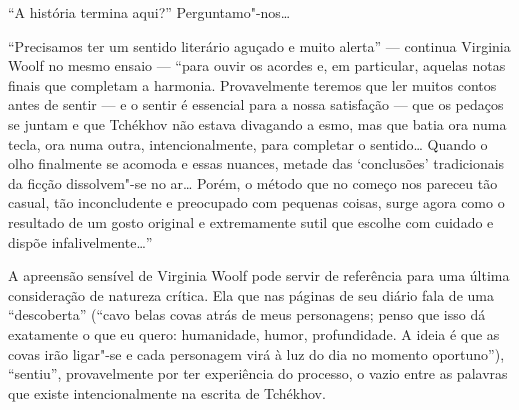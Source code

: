 {{``A história termina aqui?'' Perguntamo"-nos\ldots{}

``Precisamos ter um sentido
literário aguçado e muito alerta'' --- continua Virginia Woolf no mesmo ensaio --- ``para
ouvir os acordes e, em particular, aquelas notas finais que completam a
harmonia. Provavelmente teremos que ler muitos contos antes de sentir ---
e o sentir é essencial para a nossa satisfação --- que os pedaços se
juntam e que Tchékhov não estava divagando a esmo, mas que batia ora
numa tecla, ora numa outra, intencionalmente, para completar o
sentido\ldots{} Quando o olho finalmente se acomoda e essas nuances, metade
das `conclusões' tradicionais da ficção dissolvem"-se no ar\ldots{} Porém, o
método que no começo nos pareceu tão casual, tão inconcludente e
preocupado com pequenas coisas, surge agora como o resultado de um gosto
original e extremamente sutil que escolhe com cuidado e dispõe
infalivelmente\ldots{}''

A apreensão sensível de Virginia Woolf pode servir de referência para
uma última consideração de natureza crítica. Ela que nas páginas de seu
diário fala de uma ``descoberta'' (``cavo belas covas atrás de meus
personagens; penso que isso dá exatamente o que eu quero: humanidade,
humor, profundidade. A ideia é que as covas irão ligar"-se e cada
personagem virá à luz do dia no momento oportuno''), ``sentiu'',
provavelmente por ter experiência do processo, o vazio entre as palavras
que existe intencionalmente na escrita de Tchékhov.

}}
